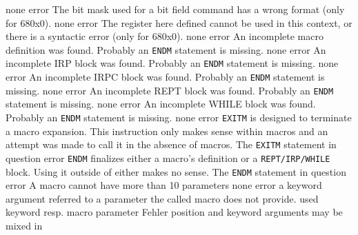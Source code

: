\documentclass[12pt,twoside]{report}
\newcommand{\tty}[1]{{\tt #1}}
\begin{document}
\begin{description}
               {none}
               {error}
               {The bit mask used for a bit field command has a wrong
                format (only for 680x0).}
               {none}
               {error}
               {The register here defined cannot be used in this context,
                or there is a syntactic error (only for 680x0).}
               {none}
               {error}
               {An incomplete macro definition was found. Probably an
                \tty{ENDM} statement is missing.}
               {none}
               {error}
               {An incomplete IRP block was found. Probably an
                \tty{ENDM} statement is missing.}
               {none}
               {error}
               {An incomplete IRPC block was found. Probably an
                \tty{ENDM} statement is missing.}
               {none}
               {error}
               {An incomplete REPT block was found. Probably an
                \tty{ENDM} statement is missing.}
               {none}
               {error}
               {An incomplete WHILE block was found. Probably an
                \tty{ENDM} statement is missing.}
               {none}
               {error}
               {\tty{EXITM} is designed to terminate a macro expansion.  This
                instruction only makes sense within macros and an attempt
                was made to call it in the absence of macros.}
               {The \tty{EXITM} statement in question}
               {error}
               {\tty{ENDM} finalizes either a macro's definition or a
                \tty{REPT/IRP/WHILE} block.  Using it outside of either
                makes no sense.}
               {The \tty{ENDM} statement in question}
               {error}
               {A macro cannot have more than 10 parameters}
               {none}
               {error}
               {a keyword argument referred to a parameter the
                called macro does not provide.}
               {used keyword resp. macro parameter}
               {Fehler}
               {position and keyword arguments  may be mixed in
}
\end{description}
\end{document}

